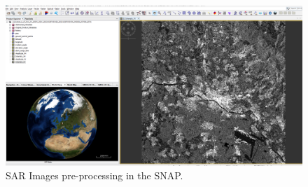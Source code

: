 \begin{figure}[H]
    \centering
    \includegraphics[width=1\textwidth]{../../Images/PNG/snap_1.png}
    \caption[SAR Images pre-processing  in the SNAP]{SAR Images pre-processing  in the SNAP.}
    \label{fig:alaska-area2}
\end{figure}




